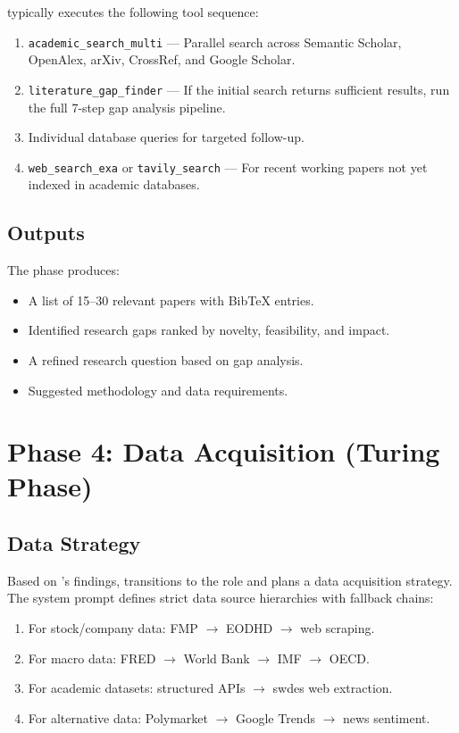 \gauss typically executes the following tool sequence:

\begin{enumerate}
  \item \texttt{academic\_search\_multi} --- Parallel search across Semantic Scholar, OpenAlex, arXiv, CrossRef, and Google Scholar.
  \item \texttt{literature\_gap\_finder} --- If the initial search returns sufficient results, run the full 7-step gap analysis pipeline.
  \item Individual database queries for targeted follow-up.
  \item \texttt{web\_search\_exa} or \texttt{tavily\_search} --- For recent working papers not yet indexed in academic databases.
\end{enumerate}

\subsection{Outputs}

The \gauss phase produces:
\begin{itemize}
  \item A list of 15--30 relevant papers with BibTeX entries.
  \item Identified research gaps ranked by novelty, feasibility, and impact.
  \item A refined research question based on gap analysis.
  \item Suggested methodology and data requirements.
\end{itemize}

\section{Phase 4: Data Acquisition (Turing Phase)}
\label{sec:pipeline:data}

\subsection{Data Strategy}

Based on \gauss's findings, \euler transitions to the \turing role and plans a data acquisition strategy.
The system prompt defines strict data source hierarchies with fallback chains:

\begin{enumerate}
  \item For stock/company data: FMP $\to$ EODHD $\to$ web scraping.
  \item For macro data: FRED $\to$ World Bank $\to$ IMF $\to$ OECD.
  \item For academic datasets: structured APIs $\to$ \gls{swdes} web extraction.
  \item For alternative data: Polymarket $\to$ Google Trends $\to$ news sentiment.
\end{enumerate}

